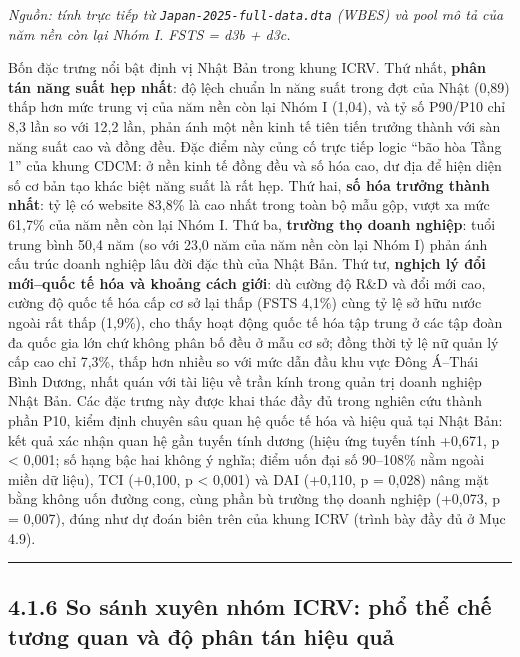\documentclass[
  a4paper,
  13pt]{extreport}
\begin{document}
\emph{Nguồn: tính trực tiếp từ \texttt{Japan-2025-full-data.dta} (WBES)
và pool mô tả của năm nền còn lại Nhóm I. FSTS = d3b + d3c.}

Bốn đặc trưng nổi bật định vị Nhật Bản trong khung ICRV. Thứ nhất,
\textbf{phân tán năng suất hẹp nhất}: độ lệch chuẩn ln năng suất trong
đợt của Nhật (0,89) thấp hơn mức trung vị của năm nền còn lại Nhóm I
(1,04), và tỷ số P90/P10 chỉ 8,3 lần so với 12,2 lần, phản ánh một nền
kinh tế tiên tiến trưởng thành với sàn năng suất cao và đồng đều. Đặc
điểm này củng cố trực tiếp logic ``bão hòa Tầng 1'' của khung CDCM: ở
nền kinh tế đồng đều và số hóa cao, dư địa để hiện diện số cơ bản tạo
khác biệt năng suất là rất hẹp. Thứ hai, \textbf{số hóa trưởng thành
nhất}: tỷ lệ có website 83,8\% là cao nhất trong toàn bộ mẫu gộp, vượt
xa mức 61,7\% của năm nền còn lại Nhóm I. Thứ ba, \textbf{trường thọ
doanh nghiệp}: tuổi trung bình 50,4 năm (so với 23,0 năm của năm nền còn
lại Nhóm I) phản ánh cấu trúc doanh nghiệp lâu đời đặc thù của Nhật Bản.
Thứ tư, \textbf{nghịch lý đổi mới--quốc tế hóa và khoảng cách giới}: dù
cường độ R\&D và đổi mới cao, cường độ quốc tế hóa cấp cơ sở lại thấp
(FSTS 4,1\%) cùng tỷ lệ sở hữu nước ngoài rất thấp (1,9\%), cho thấy
hoạt động quốc tế hóa tập trung ở các tập đoàn đa quốc gia lớn chứ không
phân bố đều ở mẫu cơ sở; đồng thời tỷ lệ nữ quản lý cấp cao chỉ 7,3\%,
thấp hơn nhiều so với mức dẫn đầu khu vực Đông Á--Thái Bình Dương, nhất
quán với tài liệu về trần kính trong quản trị doanh nghiệp Nhật Bản. Các
đặc trưng này được khai thác đầy đủ trong nghiên cứu thành phần P10,
kiểm định chuyên sâu quan hệ quốc tế hóa và hiệu quả tại Nhật Bản: kết
quả xác nhận quan hệ gần tuyến tính dương (hiệu ứng tuyến tính +0,671, p
\textless{} 0,001; số hạng bậc hai không ý nghĩa; điểm uốn đại số
90--108\% nằm ngoài miền dữ liệu), TCI (+0,100, p \textless{} 0,001) và
DAI (+0,110, p = 0,028) nâng mặt bằng không uốn đường cong, cùng phần bù
trường thọ doanh nghiệp (+0,073, p = 0,007), đúng như dự đoán biên trên
của khung ICRV (trình bày đầy đủ ở Mục 4.9).

\begin{center}\rule{0.5\linewidth}{0.5pt}\end{center}

\hypertarget{so-suxe1nh-xuyuxean-nhuxf3m-icrv-phux1ed5-thux1ec3-chux1ebf-tux1b0ux1a1ng-quan-vuxe0-ux111ux1ed9-phuxe2n-tuxe1n-hiux1ec7u-quux1ea3}{%
\subsection{4.1.6 So sánh xuyên nhóm ICRV: phổ thể chế tương quan và độ
phân tán hiệu
quả}\label{so-suxe1nh-xuyuxean-nhuxf3m-icrv-phux1ed5-thux1ec3-chux1ebf-tux1b0ux1a1ng-quan-vuxe0-ux111ux1ed9-phuxe2n-tuxe1n-hiux1ec7u-quux1ea3}}
\end{document}
